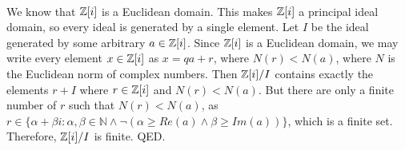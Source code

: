 \documentclass[]{article}
\begin{document}
	\paragraph{}
	We know that $\mathbb{Z}[i]$ is a Euclidean domain.\newline
	This makes $\mathbb{Z}[i]$ a principal ideal domain, so every ideal is generated by a single element.\newline
	Let $I$ be the ideal generated by some arbitrary $a \in \mathbb{Z}[i]$.\newline
	Since $\mathbb{Z}[i]$ is a Euclidean domain, we may write every element $x \in \mathbb{Z}[i]$ as $x = qa + r$, where $N(r) < N(a)$, where $N$ is the Euclidean norm of complex numbers.\newline
	Then $\mathbb{Z}[i]/I$ contains exactly the elements $r + I$ where $r \in \mathbb{Z}[i]$ and $N(r) < N(a)$.\newline
	But there are only a finite number of $r$ such that $N(r) < N(a)$, as $r \in \{ \alpha + \beta i : \alpha, \beta \in \mathbb{N} \wedge \neg(\alpha \ge Re(a) \wedge \beta \ge Im(a)) \}$, which is a finite set.\newline
	Therefore, $\mathbb{Z}[i]/I$ is finite. QED.
\end{document}
